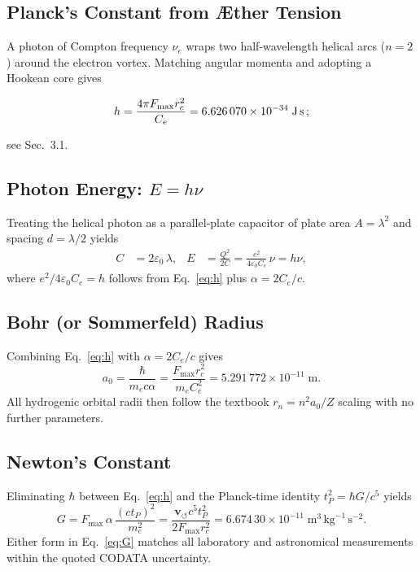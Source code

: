 \documentclass[a4paper,12pt]{article}
\begin{document}
    \subsection{Planck's Constant from Æther Tension}
    A photon of Compton frequency \(\nu_e\) wraps two half‑wavelength helical arcs (\(n=2\)) around the electron vortex. Matching angular momenta and adopting a Hookean core gives

    \begin{equation}
        h = \frac{4\pi F_{\max} r_c^{2}}{C_e}
        = 6.626\,070\times10^{-34}\;\text{J\,s}\,;
        \label{eq:h}
    \end{equation}

    see Sec.~3.1.

    \subsection{Photon Energy: \(E=h\nu\)}
    Treating the helical photon as a parallel‑plate capacitor of plate area
    \(A=\lambda^{2}\) and spacing \(d=\lambda/2\) yields
    \begin{align}
        C &= 2\varepsilon_0\,\lambda, &
        E &= \frac{Q^{2}}{2C} = \frac{e^{2}}{4\varepsilon_{0}C_e}\,\nu
        = h\nu,
        \label{eq:Einstein}
    \end{align}
    where \(e^{2}/4\varepsilon_{0}C_e=h\) follows from Eq.~\eqref{eq:h} plus
    \(\alpha=2C_e/c\).

    \subsection{Bohr (or Sommerfeld) Radius}
    Combining Eq.~\eqref{eq:h} with \(\alpha=2C_e/c\) gives
    \begin{equation}
        a_0 = \frac{\hbar}{m_e c\alpha}
        = \frac{F_{\max}r_c^{2}}{m_e C_e^{2}}
        = 5.291\,772\times10^{-11}\;\text{m}.
        \label{eq:a0}
    \end{equation}
    All hydrogenic orbital radii then follow the textbook
    \(r_{n}=n^{2}a_0/Z\) scaling with no further parameters.

    \subsection{Newton's Constant}
    Eliminating \(\hbar\) between Eq.~\eqref{eq:h} and the Planck‑time
    identity \(t_P^{2}=\hbar G/c^{5}\) yields
    \begin{equation}
        G = F_{\max}\,\alpha\,\frac{(c t_P)^{2}}{m_e^{2}}
        = \frac{\mathbf{v}_{\scriptscriptstyle\boldsymbol{\circlearrowleft}} c^{5} t_P^{2}}{2F_{\max} r_c^{2}}
        = 6.674\,30\times10^{-11}\;\text{m}^{3}\,\text{kg}^{-1}\,\text{s}^{-2}.
        \label{eq:G}
    \end{equation}
    Either form in Eq.~\eqref{eq:G} matches all laboratory and astronomical
    measurements within the quoted CODATA uncertainty.
\end{document}
